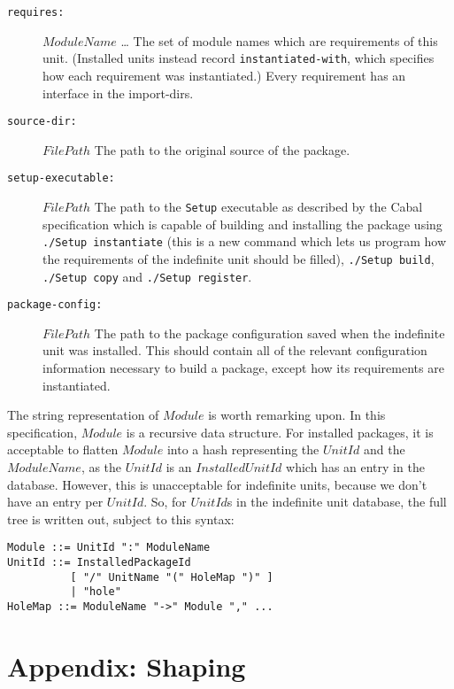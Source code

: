 \documentclass{article}
\newcommand{\I}[1]{\ensuremath{\mathit{#1}}}
\begin{document}
\begin{description}
    \item[\texttt{requires:}] \I{ModuleName} \ldots \newline
        The set of module names which are requirements of this unit.
        (Installed units instead record \texttt{instantiated-with}, which
        specifies how each requirement was instantiated.)  Every
        requirement has an interface in the import-dirs.
    \item[\texttt{source-dir:}] \I{FilePath} \newline
        The path to the original source of the package.
    \item[\texttt{setup-executable:}] \I{FilePath} \newline
        The path to the \texttt{Setup} executable as described by the Cabal
        specification which is capable of building and installing the package
        using \texttt{./Setup instantiate} (this is a new command which lets
        us program how the requirements of the indefinite unit should be filled),
        \texttt{./Setup build}, \texttt{./Setup copy} and
        \texttt{./Setup register}.
    \item[\texttt{package-config:}] \I{FilePath} \newline
        The path to the package configuration saved when the indefinite
        unit was installed.  This should contain all of the relevant configuration
        information necessary to build a package, except how its requirements
        are instantiated.
\end{description}
%
The string representation of \I{Module} is worth remarking upon.  In
this specification, \I{Module} is a recursive data structure.  For
installed packages, it is acceptable to flatten \I{Module} into a
hash representing the \I{UnitId} and the \I{ModuleName}, as the \I{UnitId}
is an \I{InstalledUnitId} which has an entry in the database.  However,
this is unacceptable for indefinite units, because we don't have an
entry per \I{UnitId}.  So, for \I{UnitId}s in the indefinite unit database,
the full tree is written out, subject to this syntax:

\begin{verbatim}
Module ::= UnitId ":" ModuleName
UnitId ::= InstalledPackageId
          [ "/" UnitName "(" HoleMap ")" ]
          | "hole"
HoleMap ::= ModuleName "->" Module "," ...
\end{verbatim}

\section{Appendix: Shaping}
\end{document}
